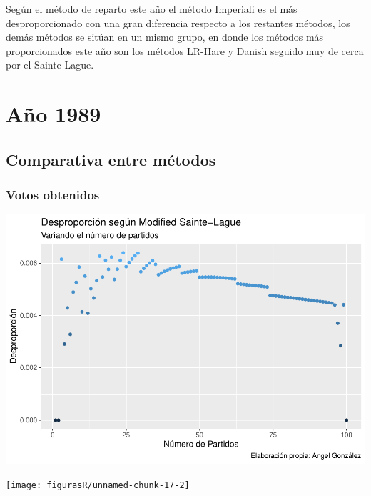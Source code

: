 \documentclass[12pt,a4paper,]{book}
\numberwithin{dummy}{section}
\theoremstyle{ocrenumbox}
\theoremstyle{blacknumex}
\theoremstyle{blacknumbox}
\theoremstyle{ocrenum}
\theoremstyle{ocrenum}
\begin{document}
Según el método de reparto este año el método Imperiali es el más
desproporcionado con una gran diferencia respecto a los restantes
métodos, los demás métodos se sitúan en un mismo grupo, en donde los
métodos más proporcionados este año son los métodos LR-Hare y Danish
seguido muy de cerca por el Sainte-Lague.

\hypertarget{auxf1o-1989}{%
\section{Año 1989}\label{auxf1o-1989}}

\hypertarget{comparativa-entre-muxe9todos-4}{%
\subsection{Comparativa entre
métodos}\label{comparativa-entre-muxe9todos-4}}

\hypertarget{votos-obtenidos-4}{%
\subsubsection{Votos obtenidos}\label{votos-obtenidos-4}}

\begin{center}\includegraphics[width=1\linewidth]{figurasR/unnamed-chunk-17-1} \end{center}

\begin{center}\texttt{[image: figurasR/unnamed-chunk-17-2]} \end{center}
\end{document}
